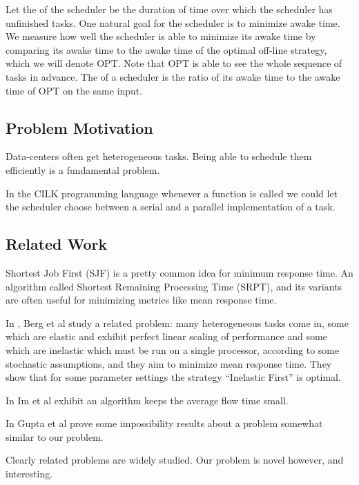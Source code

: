 Let the  of the scheduler be the duration of
time over which the scheduler has unfinished tasks. One natural
goal for the scheduler is to minimize awake time. We measure how
well the scheduler is able to minimize its awake time by
comparing its awake time to the awake time of the optimal
off-line strategy, which we will denote OPT. Note that OPT is
able to see the whole sequence of tasks in advance. The
 of a scheduler is the ratio of its awake
time to the awake time of OPT on the same input.


\subsection{Problem Motivation}
Data-centers often get heterogeneous tasks. Being able to schedule
them efficiently is a fundamental problem. 

In the CILK programming language whenever a function is called we
could let the scheduler choose between a serial and a parallel
implementation of a task. 

\subsection{Related Work}
Shortest Job First (SJF) is a pretty common idea for minimum response time. 
An algorithm called Shortest Remaining Processing Time (SRPT),
and its variants are often useful for minimizing metrics like mean
response time.

In \cite{bb20}, Berg et al study a related problem:
many heterogeneous tasks come in, some which are elastic and
exhibit perfect linear scaling of performance and some which are
inelastic which must be run on a single processor, according to
some stochastic assumptions, and they aim to minimize mean
response time. They show that for some parameter settings the
strategy \enquote{Inelastic First} is optimal.

In \cite{is16} Im et al exhibit an algorithm keeps the average
flow time small. 

In \cite{ga12} Gupta et al prove some impossibility results about
a problem somewhat similar to our problem.

Clearly related problems are widely studied.
Our problem is novel however, and interesting.

